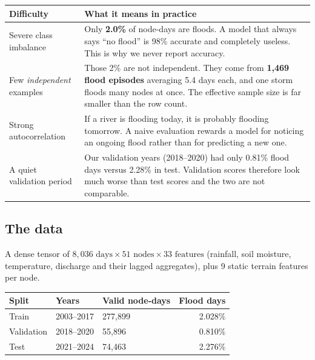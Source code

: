 \documentclass[11pt,a4paper]{article}
\begin{document}
\begin{table}[h]
\centering
\small
\begin{tabular}{@{}lp{10.5cm}@{}}
\toprule
\textbf{Difficulty} & \textbf{What it means in practice} \\
\midrule
Severe class imbalance & Only \textbf{2.0\%} of node-days are floods. A model
that always says ``no flood'' is 98\% accurate and completely useless. This is
why we never report accuracy. \\[3pt]
Few \emph{independent} examples & Those 2\% are not independent. They come from
\textbf{1,469 flood episodes} averaging 5.4 days each, and one storm floods many
nodes at once. The effective sample size is far smaller than the row count. \\[3pt]
Strong autocorrelation & If a river is flooding today, it is probably flooding
tomorrow. A naive evaluation rewards a model for noticing an ongoing flood
rather than for predicting a new one. \\[3pt]
A quiet validation period & Our validation years (2018--2020) had only 0.81\%
flood days versus 2.28\% in test. Validation scores therefore look much worse
than test scores and the two are not comparable. \\
\bottomrule
\end{tabular}
\end{table}

\subsection{The data}

A dense tensor of $8{,}036 \text{ days} \times 51 \text{ nodes} \times 33
\text{ features}$ (rainfall, soil moisture, temperature, discharge and their
lagged aggregates), plus 9 static terrain features per node.

\begin{table}[h]
\centering
\small
\begin{tabular}{@{}lllr@{}}
\toprule
\textbf{Split} & \textbf{Years} & \textbf{Valid node-days} & \textbf{Flood days} \\
\midrule
Train      & 2003--2017 & 277,899 & 2.028\% \\
Validation & 2018--2020 & 55,896  & 0.810\% \\
Test       & 2021--2024 & 74,463  & 2.276\% \\
\bottomrule
\end{tabular}
\end{table}
\end{document}
